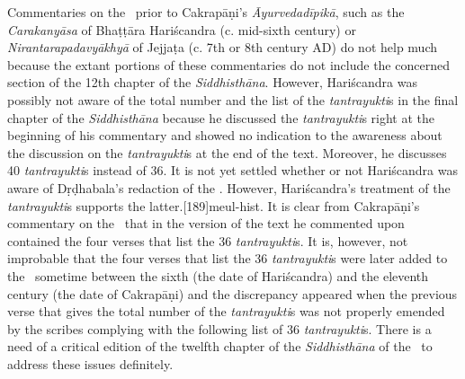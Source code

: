 Commentaries on the \CS\ prior to Cakrapāṇi's \emph{Āyurvedadīpikā}, such as the 
\emph{Carakanyāsa} of Bhaṭṭāra Hariścandra (c. mid-sixth century) or 
\emph{Nirantarapadavyākhyā} of Jejjaṭa (c. 7th or 8th century AD) do not help 
much because the extant portions of these commentaries do not include the 
concerned section of the 12th chapter of the \emph{Siddhisthāna}. However, Hariścandra was possibly not aware of the total 
number and the list of the \emph{tantrayukti}s in the final chapter of the 
\emph{Siddhisthāna} because he discussed the \emph{tantrayukti}s right at the 
beginning of his commentary and showed no indication to the awareness about the 
discussion on the \emph{tantrayukti}s at the end of the text. Moreover, he 
discusses 40 \emph{tantrayukti}s instead of 36. It is not yet settled whether or not 
Hariścandra was aware of Dṛḍhabala's redaction of the \CS. However, Hariścandra's 
treatment of the \emph{tantrayukti}s supports the latter.[189]{meul-hist}.  It 
is clear from Cakrapāṇi's commentary on the \CS\ that in the version of the text he 
commented upon contained the four verses that list the 36 \emph{tantrayukti}s. It 
is, however, not improbable that the four verses that list the 36 
\emph{tantrayukti}s were later added to the \CS\ sometime between the sixth (the 
date of Hariścandra) and the eleventh century (the date of Cakrapāṇi) and the 
discrepancy appeared when the previous verse that gives the total number of the 
\emph{tantrayukti}s was not properly emended by the scribes complying with the 
following list of 36 \emph{tantrayukti}s. There is a need of a critical edition of the 
twelfth chapter of the \emph{Siddhisthāna} of the \CS\ to address these issues 
definitely.  

